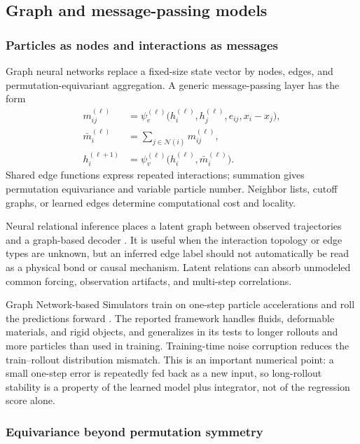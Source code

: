\subsection{Graph and message-passing models}

\subsubsection{Particles as nodes and interactions as messages}

Graph neural networks replace a fixed-size state vector by nodes, edges, and permutation-equivariant aggregation. A generic message-passing layer has the form
\begin{align}
m_{ij}^{(\ell)}
&=
\psi_e^{(\ell)}
\bigl(h_i^{(\ell)},h_j^{(\ell)},e_{ij},x_i-x_j\bigr),\\
\bar m_i^{(\ell)}
&=
\sum_{j\in\mathcal N(i)}m_{ij}^{(\ell)},\\
h_i^{(\ell+1)}
&=
\psi_v^{(\ell)}
\bigl(h_i^{(\ell)},\bar m_i^{(\ell)}\bigr).
\end{align}
Shared edge functions express repeated interactions; summation gives permutation equivariance and variable particle number. Neighbor lists, cutoff graphs, or learned edges determine computational cost and locality.

Neural relational inference places a latent graph between observed trajectories and a graph-based decoder \citep{kipf2018nri}. It is useful when the interaction topology or edge types are unknown, but an inferred edge label should not automatically be read as a physical bond or causal mechanism. Latent relations can absorb unmodeled common forcing, observation artifacts, and multi-step correlations.

Graph Network-based Simulators train on one-step particle accelerations and roll the predictions forward \citep{sanchezgonzalez2020gns}. The reported framework handles fluids, deformable materials, and rigid objects, and generalizes in its tests to longer rollouts and more particles than used in training. Training-time noise corruption reduces the train--rollout distribution mismatch. This is an important numerical point: a small one-step error is repeatedly fed back as a new input, so long-rollout stability is a property of the learned model plus integrator, not of the regression score alone.

\subsubsection{Equivariance beyond permutation symmetry}

